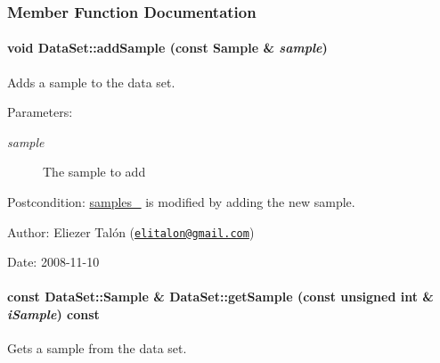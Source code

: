 \subsubsection{Member Function Documentation}
\hypertarget{class_data_set_73b646f0b40545eaf7bbe72418a0ed51}{
\paragraph[{addSample}]{\setlength{\rightskip}{0pt plus 5cm}void DataSet::addSample (const {\bf Sample} \& {\em sample})}\hfill}
\label{class_data_set_73b646f0b40545eaf7bbe72418a0ed51}


Adds a sample to the data set. 

\begin{Desc}
\item[Parameters:]
\begin{description}
\item[{\em sample}]The sample to add\end{description}
\end{Desc}
\begin{Desc}
\item[Postcondition:]\hyperlink{class_data_set_a7fbe1c9b16c2a001635e153ec1ca326}{samples\_\-} is modified by adding the new sample.\end{Desc}
\begin{Desc}
\item[Author:]Eliezer Talón (\href{mailto:elitalon@gmail.com}{\tt elitalon@gmail.com}) \end{Desc}
\begin{Desc}
\item[Date:]2008-11-10 \end{Desc}
\hypertarget{class_data_set_839eb6985338d2c83ae987e75b2d0357}{
\paragraph[{getSample}]{\setlength{\rightskip}{0pt plus 5cm}const {\bf DataSet::Sample} \& DataSet::getSample (const unsigned int \& {\em iSample}) const}\hfill}
\label{class_data_set_839eb6985338d2c83ae987e75b2d0357}


Gets a sample from the data set. 

